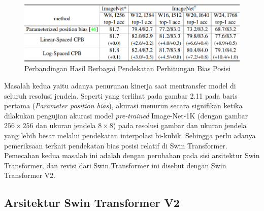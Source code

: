 \begin{figure}[ht]
  \centering
  \includegraphics[scale=0.75]{gambar/Penurunan kinerja Swin v1.png}
  \caption{Perbandingan Hasil Berbagai Pendekatan Perhitungan Bias Posisi}
  \label{fig:perbandinganberbagaihasilpendekatanperhitunganbiasposisi}
\end{figure}

Masalah kedua yaitu adanya penurunan kinerja saat mentransfer model di seluruh resolusi jendela. Seperti yang terlihat pada gambar 2.11 pada baris pertama (\emph{Parameter position bias}), akurasi menurun secara 
signifikan ketika dilakukan pengujian akurasi model \emph{pre-trained} Image-Net-1K (dengan gambar \begin{math}256\times256\end{math} dan ukuran jendela \begin{math}8\times8\end{math}) pada resolusi gambar dan ukuran 
jendela yang lebih besar melalui pendekatan interpolasi bi-kubik. Sehingga perlu adanya pemeriksaan terkait pendekatan bias posisi relatif di Swin Transformer. Pemecahan kedua masalah ini adalah dengan perubahan 
pada sisi arsitektur Swin Transformer, dan revisi dari Swin Transformer ini disebut dengan Swin Transformer V2.\parencite{Liuv22021}

\subsection{Arsitektur Swin Transformer V2}

